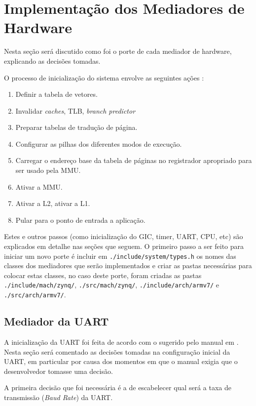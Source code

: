 \chapter{Implementação dos Mediadores de Hardware}
\label{ch:porte}

Nesta seção será discutido como foi o porte de cada mediador de hardware, explicando as decisões tomadas.

O processo de inicialização do sistema envolve as seguintes ações \cite[p.~110]{ug585.1.7}:

\begin{enumerate}
	\item Definir a tabela de vetores.
	\item Invalidar \emph{caches}, TLB, \emph{branch predictor}
	\item Preparar tabelas de tradução de página.
	\item Configurar as pilhas dos diferentes modos de execução.
	\item Carregar o endereço base da tabela de páginas no registrador apropriado para ser usado pela MMU.
	\item Ativar a MMU.
	\item Ativar a L2, ativar a L1.
	\item Pular para o ponto de entrada a aplicação.
\end{enumerate}

Estes e outros passos (como inicialização do GIC, timer, UART, CPU, etc) são explicados em detalhe nas seções que seguem. O primeiro passo a ser feito para iniciar um novo porte é incluir em \verb+./include/system/types.h+ os nomes das classes dos mediadores que serão implementados e criar as pastas necessárias para colocar estas classes, no caso deste porte, foram criadas as pastas \verb+./include/mach/zynq/+, \verb+./src/mach/zynq/+, \verb+./include/arch/armv7/+ e \verb+./src/arch/armv7/+.


\section{Mediador da UART}

A inicialização da UART foi feita de acordo com o sugerido pelo manual em \cite[p.~554]{ug585}. Nesta seção será comentado as decisões tomadas na configuração inicial da UART, em particular por causa dos momentos em que o manual exigia que o desenvolvedor tomasse uma decisão.

A primeira decisão que foi necessária é a de escabelecer qual será a taxa de transmissão (\emph{Baud Rate}) da UART. 

